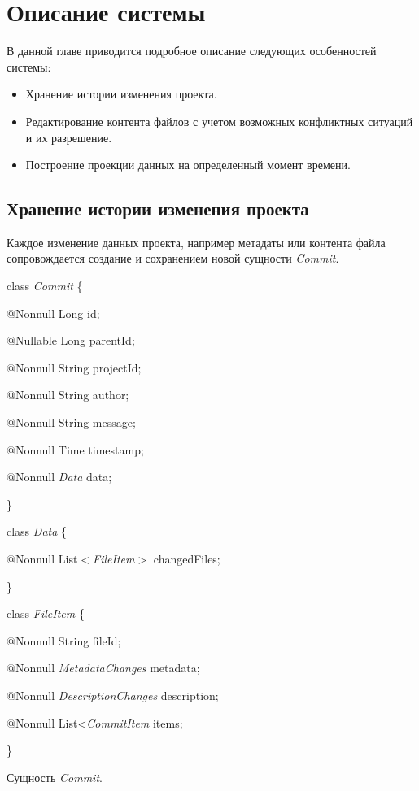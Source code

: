 \documentclass[a4paper,14pt]{extreport} %
\begin{document}
\newpage
\section{Описание системы}

В данной главе приводится подробное описание следующих особенностей системы:
\begin{itemize}
\item Хранение истории изменения проекта.
\item Редактирование контента файлов с учетом возможных конфликтных ситуаций и их разрешение.
\item Построение проекции данных на определенный момент времени.
\end{itemize} 

\subsection{Хранение истории изменения проекта}

Каждое изменение данных проекта, например метадаты или контента файла сопровождается создание и сохранением новой сущности \textit{Commit}.

\begin{algorithm}[H]
class \textit{Commit} \{

	\hspace{0.5cm}$@$Nonnull 		Long 			id;
	
	\hspace{0.5cm}$@$Nullable		Long				parentId;
	
	\hspace{0.5cm}$@$Nonnull		String			projectId;
	
	\hspace{0.5cm}$@$Nonnull		String			author;
	
	\hspace{0.5cm}$@$Nonnull		String			message;
	
	\hspace{0.5cm}$@$Nonnull		Time				timestamp;
	
	\hspace{0.5cm}$@$Nonnull		\textit{Data}	data;
	
\}

class \textit{Data} \{

	\hspace{0.5cm}$@$Nonnull	List$<$\textit{FileItem}$>$ changedFiles;
	
\}

class \textit{FileItem} \{

	\hspace{0.5cm}$@$Nonnull	String fileId;
	
	\hspace{0.5cm}$@$Nonnull	\textit{MetadataChanges} metadata;
	
	\hspace{0.5cm}$@$Nonnull	\textit{DescriptionChanges} description;
	
	\hspace{0.5cm}$@$Nonnull	List<\textit{CommitItem} items;
	
\}
\caption{Сущность \textit{Commit}.}
\label{entity_commit}
\end{algorithm}
\end{document}
